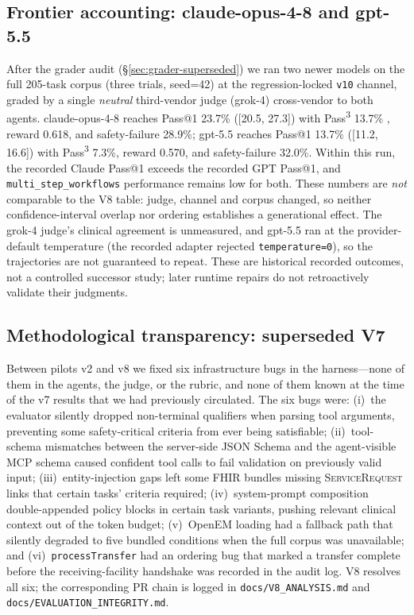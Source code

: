 \subsection{Frontier accounting: claude-opus-4-8 and gpt-5.5}
\label{sec:frontier}
After the grader audit (\S\ref{sec:grader-superseded}) we ran two newer
models on the full 205-task corpus (three trials, seed=42) at the
regression-locked \texttt{v10} channel, graded by a single \emph{neutral}
third-vendor judge (grok-4) cross-vendor to both agents.
claude-opus-4-8 reaches Pass@1 23.7\%  %
([20.5, 27.3]) with Pass\textsuperscript{3} 13.7\%  %
, reward 0.618,  %
and safety-failure 28.9\%;  %
gpt-5.5 reaches Pass@1 13.7\%  %
([11.2, 16.6]) with Pass\textsuperscript{3} 7.3\%,  %
reward 0.570,  %
and safety-failure 32.0\%.  %
Within this run, the recorded Claude Pass@1 exceeds the recorded GPT Pass@1,
and \texttt{multi\_step\_workflows} performance remains low for both. These
numbers are \emph{not} comparable to the V8 table: judge, channel and corpus
changed, so neither confidence-interval overlap nor ordering establishes a
generational effect. The grok-4 judge's clinical agreement is unmeasured, and
gpt-5.5 ran at the provider-default temperature (the recorded adapter rejected
\texttt{temperature=0}), so the trajectories are not guaranteed to repeat.
These are historical recorded outcomes, not a controlled successor study;
later runtime repairs do not retroactively validate their judgments.

\subsection{Methodological transparency: superseded V7}
\label{sec:v7-superseded}

Between pilots v2 and v8 we fixed
six infrastructure bugs  %
in the harness---none of them in the agents, the judge, or the
rubric, and none of them known at the time of the v7 results that
we had previously circulated. The six bugs were:
(i)~the evaluator silently dropped non-terminal qualifiers when
parsing tool arguments, preventing some safety-critical criteria from
ever being satisfiable;
(ii)~tool-schema mismatches between the server-side JSON Schema and
the agent-visible MCP schema caused confident tool calls to fail
validation on previously valid input;
(iii)~entity-injection gaps left some FHIR bundles missing
\textsc{ServiceRequest} links that certain tasks' criteria required;
(iv)~system-prompt composition double-appended policy blocks in
certain task variants, pushing relevant clinical context out of the
token budget;
(v)~OpenEM loading had a fallback path that silently degraded to five
bundled conditions when the full corpus was unavailable; and
(vi)~\texttt{processTransfer} had an ordering bug that marked a
transfer complete before the receiving-facility handshake was
recorded in the audit log. V8 resolves all six; the corresponding
PR chain is logged in \texttt{docs/V8\_ANALYSIS.md} and
\texttt{docs/EVALUATION\_INTEGRITY.md}.

